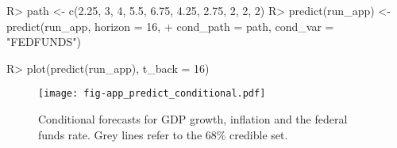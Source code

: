 \documentclass[article,nojss]{jss} %
\begin{document}
\begin{appendix}
\begin{Schunk}
\begin{Sinput}
R> path <- c(2.25, 3, 4, 5.5, 6.75, 4.25, 2.75, 2, 2, 2)
R> predict(run_app) <- predict(run_app, horizon = 16,
+    cond_path = path, cond_var = "FEDFUNDS")
\end{Sinput}
\end{Schunk}
\begin{Schunk}
\begin{Sinput}
R> plot(predict(run_app), t_back = 16)
\end{Sinput}
\end{Schunk}

\begin{figure}[ht]
	\centering
  \texttt{[image: fig-app\_predict\_conditional.pdf]}
	\caption{Conditional forecasts for GDP growth, inflation and the federal funds rate. Grey lines refer to the 68\% credible set.}
	\label{fig:app_predict_conditional}
\end{figure}

\clearpage


\end{appendix}

\end{document}
